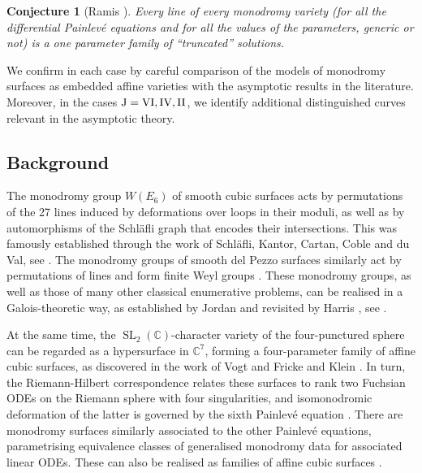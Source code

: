 \documentclass[a4paper,reqno]{amsart}
\numberwithin{equation}{section}
\newcommand{\C}{\mathbb{C}}
\newtheorem{conjecture}[theorem]{Conjecture}
\numberwithin{equation}{section}
\begin{document}
\begin{conjecture}[Ramis \cite{ramis}]\label{conjectureramis}
	Every line of every monodromy variety (for all the differential Painlevé equations and for all the values of the parameters, generic or not) is a one parameter family of “truncated” solutions.
\end{conjecture}

We confirm  in each case by careful comparison of the models of monodromy surfaces as embedded affine varieties with the asymptotic results in the literature. Moreover, in the cases $\rm{J}=\rm{VI},\rm{IV},\rm{II}$, we identify additional distinguished curves relevant in the asymptotic theory.


\subsection{Background}

The monodromy group $W(E_6)$ of smooth cubic surfaces acts by permutations of the 27 lines induced by deformations over loops in their moduli, as well as by automorphisms of the Schl\"afli graph that encodes their intersections. 
This was famously established through the work of Schl\"afli, Kantor, Cartan, Coble and du Val, see \cite[Sec. 8 \& 9]{dolgachevclassicalAG}. 
The monodromy groups of smooth del Pezzo surfaces similarly act by permutations of lines and form finite Weyl groups \cites{dolgachevclassicalAG,fangdelpezzo}.
These monodromy groups, as well as those of many other classical enumerative problems,  can be realised in a Galois-theoretic way, as established by Jordan \cite{jordan1870} and revisited by Harris \cite{harris1979}, see \cite{sottileyahl}.

At the same time, the $\operatorname{SL}_2(\C)$-character variety of the four-punctured sphere can be regarded as a hypersurface in $\mathbb{C}^7$, forming a four-parameter family of affine cubic surfaces, as discovered in the work of Vogt \cite{vogt} and Fricke and Klein \cite{frickeklein}.
In turn, the Riemann-Hilbert correspondence \cites{deligne70,jimbo1982} relates these surfaces to rank two Fuchsian ODEs on the Riemann sphere with four singularities, and isomonodromic deformation of the latter is governed by the sixth Painlev\'e equation \cite{fuchs1905}.
There are monodromy surfaces similarly associated to the other Painlev\'e equations, parametrising equivalence classes of generalised monodromy data for associated linear ODEs. These can also be realised as families of affine cubic surfaces \cites{putsaito,chekhovdecorated}. 
\end{document}
